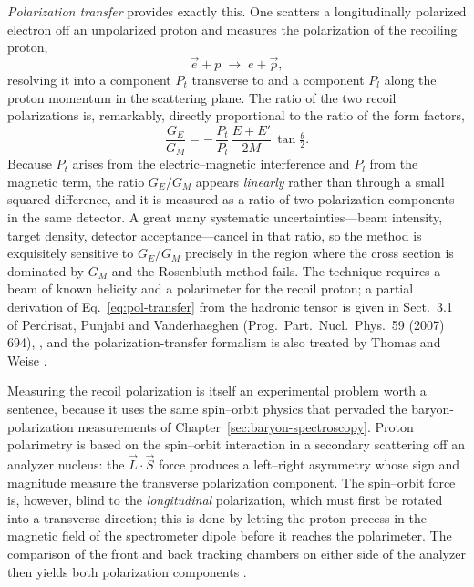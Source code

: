 \emph{Polarization transfer} provides exactly this. One scatters a longitudinally
polarized electron off an unpolarized proton and measures the polarization of the
recoiling proton,
\begin{equation}
    \vec e + p \;\rightarrow\; e + \vec p,
\end{equation}
resolving it into a component $P_{t}$ transverse to and a component $P_{l}$ along the
proton momentum in the scattering plane. The ratio of the two recoil polarizations is,
remarkably, directly proportional to the ratio of the form factors,
\begin{equation}
    \frac{G_{E}}{G_{M}}
    = -\,\frac{P_{t}}{P_{l}}\,\frac{E+E'}{2M}\,\tan\tfrac{\theta}{2}.
    \label{eq:pol-transfer}
\end{equation}
Because $P_{t}$ arises from the electric--magnetic interference and $P_{l}$ from the
magnetic term, the ratio $G_{E}/G_{M}$ appears \emph{linearly} rather than through a
small squared difference, and it is measured as a ratio of two polarization components
in the same detector. A great many systematic uncertainties---beam intensity, target
density, detector acceptance---cancel in that ratio, so the method is exquisitely
sensitive to $G_{E}/G_{M}$ precisely in the region where the cross section is dominated
by $G_{M}$ and the Rosenbluth method fails. The technique requires a beam of known
helicity and a polarimeter for the recoil proton; a partial derivation of
Eq.~\eqref{eq:pol-transfer} from the hadronic tensor is given in Sect.~3.1 of
Perdrisat, Punjabi and Vanderhaeghen (Prog.\ Part.\ Nucl.\ Phys.\ 59 (2007) 694),
\cite[Ch.~14]{Amsler2018}, and the polarization-transfer
formalism is also treated by Thomas and Weise \cite[Ch.~2.2]{ThomasWeise2001}.

Measuring the recoil polarization is itself an experimental problem worth a sentence,
because it uses the same spin--orbit physics that pervaded the baryon-polarization
measurements of Chapter~\ref{sec:baryon-spectroscopy}. Proton polarimetry is based on
the spin--orbit interaction in a secondary scattering off an analyzer nucleus: the
$\vec L\cdot\vec S$ force produces a left--right asymmetry whose sign and magnitude
measure the transverse polarization component. The spin--orbit force is, however, blind
to the \emph{longitudinal} polarization, which must first be rotated into a transverse
direction; this is done by letting the proton precess in the magnetic field of the
spectrometer dipole before it reaches the polarimeter. The comparison of the front and
back tracking chambers on either side of the analyzer then yields both polarization
components \cite[Ch.~14]{Amsler2018}.

